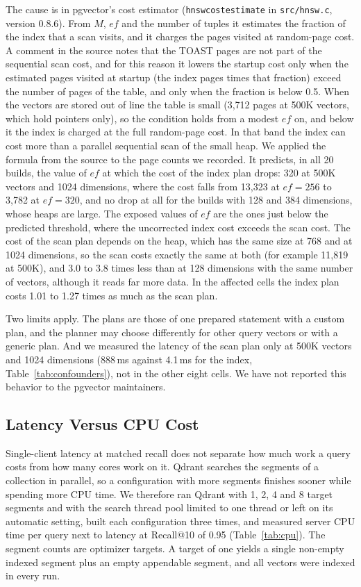 \documentclass[sigconf, nonacm]{acmart}
\begin{document}
The cause is in pgvector's cost estimator (\texttt{hnswcostestimate} in \texttt{src/hnsw.c},
version 0.8.6). From $M$, $ef$ and the number of tuples it estimates the fraction of the index
that a scan visits, and it charges the pages visited at random-page cost. A comment in the
source notes that the TOAST pages are not part of the sequential scan cost, and for this reason
it lowers the startup cost only when the estimated pages visited at startup (the index pages
times that fraction) exceed the number of pages of the table, and only when the fraction is
below 0.5. When the vectors are stored out of line the table is small (3{,}712 pages at 500K
vectors, which hold pointers only), so the condition holds from a modest $ef$ on, and below it
the index is charged at the full random-page cost. In that band the index can cost more than a
parallel sequential scan of the small heap. We applied the formula from the source to the page
counts we recorded. It predicts, in all 20 builds, the value of $ef$ at which the cost of the
index plan drops: 320 at 500K vectors and 1024 dimensions, where the cost falls from 13{,}323
at $ef=256$ to 3{,}782 at $ef=320$, and no drop at all for the builds with 128 and 384
dimensions, whose heaps are large. The exposed values of $ef$ are the ones just below the
predicted threshold, where the uncorrected index cost exceeds the scan cost. The cost of the
scan plan depends on the heap, which has the same size at 768 and at 1024 dimensions, so the
scan costs exactly the same at both (for example 11{,}819 at 500K), and 3.0 to 3.8 times less
than at 128 dimensions with the same number of vectors, although it reads far more data. In the
affected cells the index plan costs 1.01 to 1.27 times as much as the scan plan.

Two limits apply. The plans are those of one prepared statement with a custom plan, and the
planner may choose differently for other query vectors or with a generic plan. And we
measured the latency of the scan plan only at 500K vectors and 1024 dimensions (888\,ms
against 4.1\,ms for the index, Table~\ref{tab:confounders}), not in the other eight cells.
We have not reported this behavior to the pgvector maintainers.

\subsection{Latency Versus CPU Cost}
\label{sec:cpu}

Single-client latency at matched recall does not separate how much work a query costs
from how many cores work on it. Qdrant searches the segments of a collection in
parallel, so a configuration with more segments finishes sooner while spending more
CPU time. We therefore ran Qdrant with 1, 2, 4 and 8 target segments and with the
search thread pool limited to one thread or left on its automatic setting, built each
configuration three times, and measured server CPU time per query next to latency at
Recall@10 of 0.95 (Table~\ref{tab:cpu}). The segment counts are optimizer targets. A
target of one yields a single non-empty indexed segment plus an empty appendable
segment, and all vectors were indexed in every run.
\end{document}
